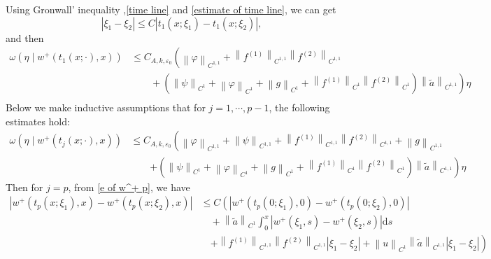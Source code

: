 \documentclass[a4paper,reqno,11pt]{amsart}
\numberwithin{equation}{section} %
\begin{document}
Using Gronwall' inequality ,\eqref{time line} and \eqref{estimate of time line}, we can get
$$
\left| \xi _1-\xi _2 \right|\leq C\left| t_1\left( x;\xi _1 \right) -t_1\left( x;\xi _2 \right) \right|,
$$
and then
$$
\begin{aligned}
\omega \left( \eta \mid w^+\left( t_1\left( x;\cdot \right) ,x \right) \right) & \leq C_{A,k,\varepsilon _0}\left( \left\| \varphi \right\| _{C^{1,1}} +\left\| f^{(1)} \right\| _{C^{1,1}}\left\| f^{(2)} \right\| _{C^{1,1}} \right.\\
  &\qquad  +\left. (\left\| \psi \right\| _{C^1}+\left\| \varphi \right\| _{C^1}+\left\| g \right\| _{C^1}+\left\| f^{(1)} \right\| _{C^1}\left\| f^{(2)} \right\| _{C^1})\left\| \tilde{a} \right\| _{C^{1,1}} \right) \eta \\
\end{aligned}
$$
Below we make inductive assumptions that for $j=1,\cdots,p-1$, the following estimates hold:
\begin{equation}\label{inductive assumption for w eta}
\begin{aligned}
\omega \left( \eta \mid w^+\left( t_j\left( x;\cdot \right) ,x \right) \right) &\leq  C_{A,k,\varepsilon _0}\left( \left\| \varphi \right\| _{C^{1,1}}+\left\| \psi \right\| _{C^{1,1}}+\left\| f^{(1)} \right\| _{C^{1,1}}\left\| f^{(2)} \right\| _{C^{1,1}}+\left\| g \right\| _{C^{1,1}}\right. \\
& \qquad \left.+(\left\| \psi \right\| _{C^1}+\left\| \varphi \right\| _{C^1}+\left\| g \right\| _{C^1}+\left\| f^{(1)} \right\| _{C^1}\left\| f^{(2)} \right\| _{C^1})\left\| \tilde{a} \right\| _{C^{1,1}} \right) \eta 
\end{aligned}
\end{equation}
Then for $j=p$, from \eqref{e of w^+ p}, we have
$$
\begin{aligned}
	\left| w^+\left( t_p\left( x;\xi _1 \right) ,x \right) -w^+\left( t_p\left( x;\xi _2 \right) ,x \right) \right|&\le C\left( \left| w^+\left( t_p\left( 0;\xi _1 \right) ,0 \right) -w^+\left( t_p\left( 0;\xi _2 \right) ,0 \right) \right| \right.\\
	&\quad  +\left\| \tilde{a} \right\| _{C^1}\int_0^x{\left| w^+\left( \xi _1,s \right) -w^+\left( \xi _2,s \right) \right|\mathrm{d}s}\\
	&\quad \left.  +\left\| f^{\left( 1 \right)} \right\| _{C^{1,1}}\left\| f^{\left( 2 \right)} \right\| _{C^{1,1}}\left| \xi _1-\xi _2 \right|+\left\| u \right\| _{C^1}\left\| \tilde{a} \right\| _{C^{1,1}}\left| \xi _1-\xi _2 \right| \right)\\
\end{aligned}
$$
\end{document}
